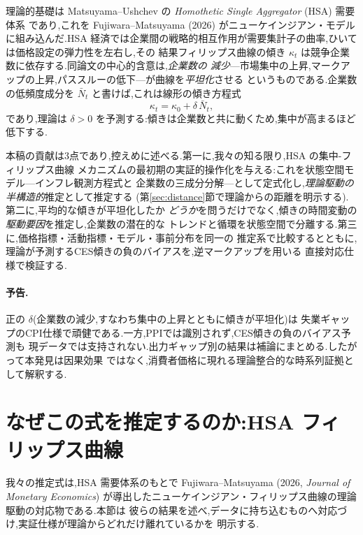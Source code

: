 \documentclass[11pt]{article}
\newcommand{\kt}{\kappa_t}
\begin{document}
理論的基礎は Matsuyama--Ushchev の \emph{Homothetic Single Aggregator} (HSA) 需要体系
であり,これを Fujiwara--Matsuyama (2026) がニューケインジアン・モデルに組み込んだ.HSA
経済では企業間の戦略的相互作用が需要集計子の曲率,ひいては価格設定の弾力性を左右し,その
結果フィリップス曲線の傾き $\kt$ は競争企業数に依存する.同論文の中心的含意は,\emph{企業数の
減少}---市場集中の上昇,マークアップの上昇,パススルーの低下---が曲線を\emph{平坦化}させる
というものである.企業数の低頻度成分を $\bar N_t$ と書けば,これは線形の傾き方程式
\begin{equation}
\kt=\kappa_0+\delta\,\bar N_t,
\end{equation}
であり,理論は $\delta>0$ を予測する:傾きは企業数と共に動くため,集中が高まるほど低下する.

本稿の貢献は3点であり,控えめに述べる.第一に,我々の知る限り,HSA の集中-フィリップス曲線
メカニズムの最初期の実証的操作化を与える:これを状態空間モデル---インフレ観測方程式と
企業数の三成分分解---として定式化し,\emph{理論駆動の半構造的}推定として推定する
(第\ref{sec:distance}節で理論からの距離を明示する).第二に,平均的な傾きが平坦化したか
\emph{どうか}を問うだけでなく,傾きの時間変動の\emph{駆動要因}を推定し,企業数の潜在的な
トレンドと循環を状態空間で分離する.第三に,価格指標・活動指標・モデル・事前分布を同一の
推定系で比較するとともに,理論が予測するCES傾きの負のバイアスを,逆マークアップを用いる
直接対応仕様で検証する.

\paragraph{予告.} 正の $\delta$(企業数の減少,すなわち集中の上昇とともに傾きが平坦化)は
失業ギャップのCPI仕様で頑健である.一方,PPIでは識別されず,CES傾きの負のバイアス予測も
現データでは支持されない.出力ギャップ別の結果は補論にまとめる.したがって本発見は因果効果
ではなく,消費者価格に現れる理論整合的な時系列証拠として解釈する.

\section{なぜこの式を推定するのか:HSA フィリップス曲線}
\label{sec:why}
我々の推定式は,HSA 需要体系のもとで Fujiwara--Matsuyama (2026, \emph{Journal of Monetary
Economics}) が導出したニューケインジアン・フィリップス曲線の理論駆動の対応物である.本節は
彼らの結果を述べ,データに持ち込むものへ対応づけ,実証仕様が理論からどれだけ離れているかを
明示する.
\end{document}
